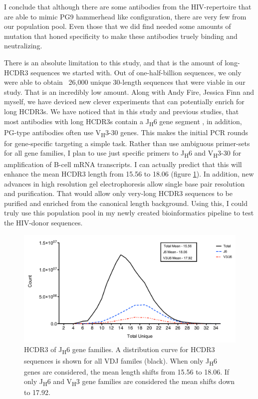 I conclude that although there are some antibodies from the HIV-\naive repertoire that are able to mimic PG9 hammerhead like configuration, there are very few from our population pool. Even those that we did find needed some amounts of mutation that honed specificity to make these antibodies truely binding and neutralizing.

There is an absolute limitation to this study, and that is the amount of long-HCDR3 sequences we started with. Out of one-half-billion sequences, we only were able to obtain ~26,000 unique 30-length sequences that were viable in our study. That is an incredibly low amount. Along with Andy Fire, Jessica Finn and myself, we have deviced new clever experiments that can potentially enrich for long HCDR3s. We have noticed that in this study and previous studies, that most antibodies with long HCDR3s contain a J\textsubscript{H}6 gene segment \citep{Briney:2012ib}, in addition, PG-type antibodies often use V\textsubscript{H}3-30 genes. This makes the initial PCR rounds for gene-specific targeting a simple task. Rather than use ambiguous primer-sets for all gene families, I plan to use just specific primers to J\textsubscript{H}6 and V\textsubscript{H}3-30 for amplification of B-cell mRNA transcripts. I can actually predict that this will enhance the mean HCDR3 length from 15.56 to 18.06 (figure \ref{fig:fig5_3}). In addition, new advances in high resolution gel electrophoresis allow single base pair resolution and purification. That would allow only very-long HCDR3 sequences to be purified and enriched from the canonical length background. Using this, I could truly use this population pool in my newly created bioinformatics pipeline to test the HIV-\naive donor sequences.

\begin{figure}[!t]
   \centering
   \includegraphics[width=.9\textwidth]{images/chapter5/figure5_3.pdf}
   \caption[HCDR3 of J\textsubscript{H}6 Gene Families]{HCDR3 of J\textsubscript{H}6 gene families. A distribution curve for HCDR3 sequences is shown for all VDJ familes (black). When only J\textsubscript{H}6 genes are considered, the mean length shifts from 15.56 to 18.06. If only J\textsubscript{H}6 and V\textsubscript{H}3 gene families are considered the mean shifts down to 17.92.}
       \label{fig:fig5_3}
\end{figure}

